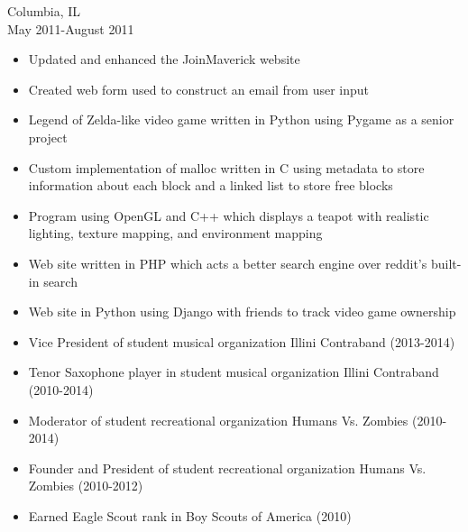 \documentclass[11pt]{article}
\begin{document}
     \hfill Columbia, IL\\
     \hfill May 2011-August 2011
    \begin{itemize}[noitemsep,topsep=0pt,leftmargin=52pt]
      \item Updated and enhanced the JoinMaverick website
      \item Created web form used to construct an email from user input
    \end{itemize}

  \bigskip

  \begin{itemize}[noitemsep,topsep=0pt]
    \item Legend of Zelda-like video game written in Python using Pygame 
      as a senior project
    \item Custom implementation of malloc written in C using metadata to store
      information about each block and a linked list to store free blocks
    \item Program using OpenGL and C++ which displays a teapot with realistic 
      lighting, texture mapping, and environment mapping
    \item Web site written in PHP which acts a better search engine over
      reddit's built-in search
    \item Web site in Python using Django with friends to track video game
      ownership
  \end{itemize}

  \bigskip

  \begin{itemize}[noitemsep,topsep=0pt]
    \item Vice President of student musical organization Illini Contraband
      \hfill (2013-2014)
    \item Tenor Saxophone player in student musical organization
      Illini Contraband \hfill (2010-2014)
    \item Moderator of student recreational organization Humans Vs. Zombies
      \hfill (2010-2014)
    \item Founder and President of student recreational organization Humans
      Vs. Zombies \hfill (2010-2012)
    \item Earned Eagle Scout rank in Boy Scouts of America \hfill (2010)
  \end{itemize}
\end{document}
